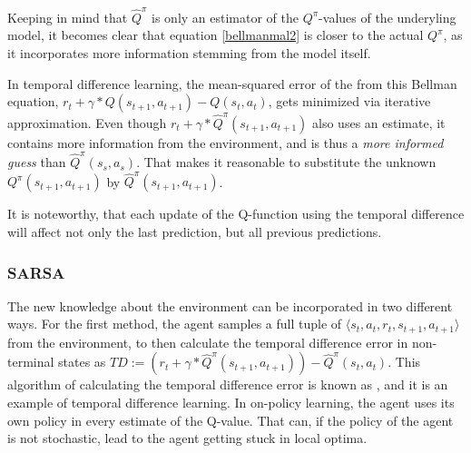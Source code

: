
Keeping in mind that $\hat{Q}^\pi$ is only an estimator of the $Q^\pi$-values of the underyling model, it becomes clear that equation \ref{bellmanmal2} is closer to the actual $Q^\pi$, as it incorporates more information stemming from the model itself. 

In temporal difference learning, the mean-squared error of the  from this Bellman equation, $r_t + \gamma * Q(s_{t+1},a_{t+1}) - Q(s_t,a_t)$, gets minimized via iterative approximation. Even though $r_t + \gamma * \hat{Q}^\pi(s_{t+1},a_{t+1})$ also uses an estimate, it contains more information from the environment, and is thus a \textit{more informed guess} than $\hat{Q}^\pi(s_s,a_s)$. That makes it reasonable to substitute the unknown $Q^\pi(s_{t+1},a_{t+1})$ by $\hat{Q}^\pi(s_{t+1},a_{t+1})$.

\noindent It is noteworthy, that each update of the Q-function using the temporal difference will affect not only the last prediction, but all previous predictions.



\subsubsection{\textsc{SARSA}}
The new knowledge about the environment can be incorporated in two different ways. For the first method, the agent samples a full tuple of $\langle s_t, a_t, r_t, s_{t+1}, a_{t+1} \rangle$ from the environment, to then calculate the temporal difference error in non-terminal states as $ TD := (r_t + \gamma * \hat{Q}^\pi(s_{t+1}, a_{t+1})) - \hat{Q}^\pi(s_t, a_t)  $. This algorithm of calculating the temporal difference error is known as  , and it is an example of  temporal difference learning. In on-policy learning, the agent uses its own policy in every estimate of the Q-value. That can, if the policy of the agent is not stochastic, lead to the agent getting stuck in local optima.

